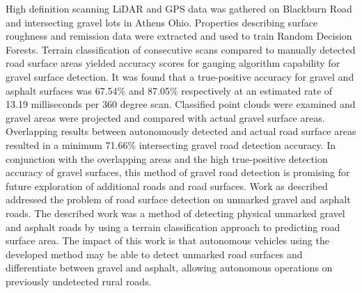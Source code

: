 \documentclass[journal,onecolumn]{IEEEtran}
\begin{document}
		{High definition scanning LiDAR and GPS data was gathered on Blackburn Road and intersecting gravel lots in Athens Ohio. Properties describing surface roughness and remission data were extracted and used to train Random Decision Forests. Terrain classification of consecutive scans compared to manually detected road surface areas yielded accuracy scores for gauging algorithm capability for gravel surface detection. It was found that a true-positive accuracy for gravel and asphalt surfaces was 67.54\% and 87.05\% respectively at an estimated rate of 13.19 milliseconds per 360 degree scan. Classified point clouds were examined and gravel areas were projected and compared with actual gravel surface areas. Overlapping results between autonomously detected and actual road surface areas resulted in a minimum  71.66\% intersecting gravel road detection accuracy. In conjunction with the overlapping areas and the high true-positive detection accuracy of gravel surfaces, this method of gravel road detection is promising for future exploration of additional roads and road surfaces. Work as described addressed the problem of road surface detection on unmarked gravel and asphalt roads. The described work was a method of detecting physical unmarked gravel and asphalt roads by using a terrain classification approach to predicting road surface area. The impact of this work is that autonomous vehicles using the developed method may be able to detect unmarked road surfaces and differentiate between gravel and asphalt, allowing autonomous operations on previously undetected rural roads.} 

%
\IEEEpeerreviewmaketitle




\end{document}

